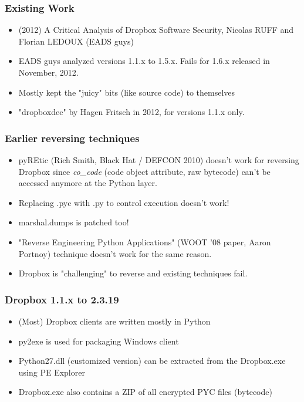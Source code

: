 \documentclass{beamer}
\newcommand\myfont{\fontsize{14}{20}\selectfont}
\begin{document}
\begin{frame}
\frametitle{Existing Work}
\myfont
\begin{itemize}
\itemsep 0.7em
\item (2012) A Critical Analysis of Dropbox Software Security, Nicolas RUFF and Florian LEDOUX (EADS guys)
\item EADS guys analyzed versions 1.1.x to 1.5.x. Fails for 1.6.x released in November, 2012.
\item Mostly kept the "juicy" bits (like source code) to themselves
\item "dropboxdec" by Hagen Fritsch in 2012, for versions 1.1.x only.
\end{itemize}
\end{frame}

\begin{frame}
\frametitle{Earlier reversing techniques}
\begin{itemize}
	\itemsep 0.75em
	\item pyREtic (Rich Smith, Black Hat / DEFCON 2010) doesn't work for reversing Dropbox since \emph{co\_code} (code object attribute, raw bytecode) can't be accessed anymore at the Python layer.
	\item Replacing .pyc with .py to control execution doesn't work!
	\item marshal.dumps is patched too!
	\item "Reverse Engineering Python Applications" (WOOT '08 paper, Aaron Portnoy) technique doesn't work for the same reason.
	\item Dropbox is "challenging" to reverse and existing techniques fail.
\end{itemize}
\end{frame}

\begin{frame}
\frametitle{Dropbox 1.1.x to 2.3.19}
\myfont
\begin{itemize}
\itemsep 1em
\item (Most) Dropbox clients are written mostly in Python

\item py2exe is used for packaging Windows client

\item Python27.dll (customized version) can be extracted from the Dropbox.exe using PE Explorer

\item Dropbox.exe also contains a ZIP of all encrypted PYC files (bytecode)
\end{itemize}
\end{frame}
\end{document}
